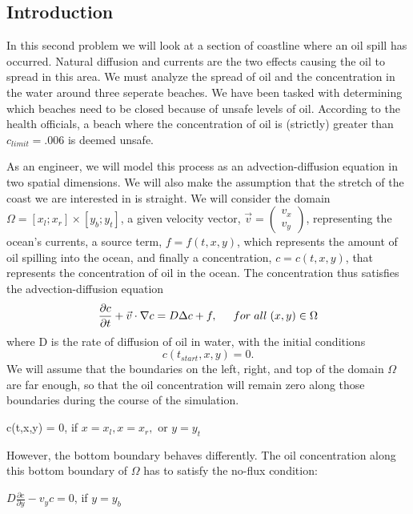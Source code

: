 \documentclass[12pt]{article}
\begin{document}
\subsection*{Introduction}
In this second problem we will look at a section of coastline where an oil spill has occurred. Natural diffusion and currents are the two effects causing the oil to spread in this area. We must analyze the spread of oil and the concentration in the water around three seperate beaches. We have been tasked with determining which beaches need to be closed because of unsafe levels of oil. According to the health officials, a beach where the concentration of oil is (strictly) greater than $c_{limit} = .006$ is deemed unsafe.

As an engineer, we will model this process as an advection-diffusion equation in two spatial dimensions. We will also make the assumption that the stretch of the coast we are interested in is straight. We will consider the domain $\Omega = [x_l;x_r] \times [y_b;y_t]$, a given velocity vector, $\vec{v} = \begin{pmatrix}v_{x}\\v_{y}\end{pmatrix}$, representing the ocean's currents, a source term, $f = f(t,x,y)$, which represents the amount of oil spilling into the ocean, and finally a concentration, $c = c(t,x,y)$, that represents the concentration of oil in the ocean. The concentration thus satisfies the advection-diffusion equation
\begin{equation}
\frac{\partial c}{\partial t} + \vec{v} \cdot \nabla c = D\Delta c + f, \hspace{.5cm} for\hspace{.1cm}all\hspace{.1cm} (x,y) \in \Omega
\end{equation}
\noindent where D is the rate of diffusion of oil in water, with the initial conditions
\begin{equation*}
c(t_{start},x,y) = 0.
\end{equation*}
\noindent
We will assume that the boundaries on the left, right, and top of the domain $\Omega$ are far enough, so that the oil concentration will remain zero along those boundaries during the course of the simulation.
\begin{center}
c(t,x,y) = 0, \hspace{.5cm}if $x = x_l, x = x_r,$ or $y = y_t$
\end{center}

However, the bottom boundary behaves differently. The oil concentration along this bottom boundary of $\Omega$ has to satisfy the no-flux condition:
\begin{center}
$D\frac{\partial c}{\partial y} - v_yc = 0$,\hspace{.5cm} if $y = y_b$
\end{center}
\newpage
\end{document}
